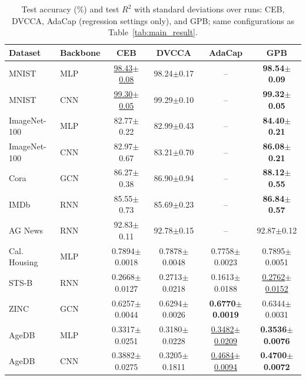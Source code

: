 \par\smallskip
\begin{table}[t]
\centering
\caption{Test accuracy (\%) and test $R^2$ with standard deviations over runs: CEB, DVCCA, AdaCap (regression settings only), and GPB; same configurations as Table~\ref{tab:main_result}.}
\label{tab:main_result_std_variants}
\small
{
\setlength{\tabcolsep}{1.5pt}
\begin{tabular}{llccc|c}
\hline
Dataset & Backbone & CEB & DVCCA & AdaCap & GPB \\
\hline
MNIST & MLP & \underline{98.43$\pm$0.08} & 98.24$\pm$0.17 & -- & \textbf{98.54$\pm$0.09} \\
MNIST & CNN & \underline{99.30$\pm$0.05} & 99.29$\pm$0.10 & -- & \textbf{99.32$\pm$0.05} \\
ImageNet-100 & MLP & 82.77$\pm$0.22 & 82.99$\pm$0.43 & -- & \textbf{84.40$\pm$0.21} \\
ImageNet-100 & CNN & 82.97$\pm$0.67 & 83.21$\pm$0.70 & -- & \textbf{86.08$\pm$0.21} \\
Cora & GCN & 86.27$\pm$0.38 & 86.90$\pm$0.94 & -- & \textbf{88.12$\pm$0.55} \\
IMDb & RNN & 85.55$\pm$0.73 & 85.69$\pm$0.23 & -- & \textbf{86.84$\pm$0.57} \\
AG News & RNN & 92.83$\pm$0.11 & 92.78$\pm$0.15 & -- & 92.87$\pm$0.12 \\
\hline\hline
Cal. Housing & MLP & 0.7894$\pm$0.0018 & 0.7878$\pm$0.0048 & 0.7758$\pm$0.0023 & 0.7895$\pm$0.0051 \\
STS-B & RNN & 0.2668$\pm$0.0127 & 0.2713$\pm$0.0218 & 0.1613$\pm$0.0188 & \underline{0.2762$\pm$0.0152} \\
ZINC & GCN & 0.6257$\pm$0.0044 & 0.6294$\pm$0.0026 & \textbf{0.6770$\pm$0.0019} & 0.6344$\pm$0.0031 \\
AgeDB & MLP & 0.3317$\pm$0.0251 & 0.3180$\pm$0.0228 & \underline{0.3482$\pm$0.0209} & \textbf{0.3536$\pm$0.0076} \\
AgeDB & CNN & 0.3882$\pm$0.0275 & 0.3205$\pm$0.1811 & \underline{0.4684$\pm$0.0094} & \textbf{0.4700$\pm$0.0072} \\
\hline
\end{tabular}
}
\end{table}
\par\smallskip
